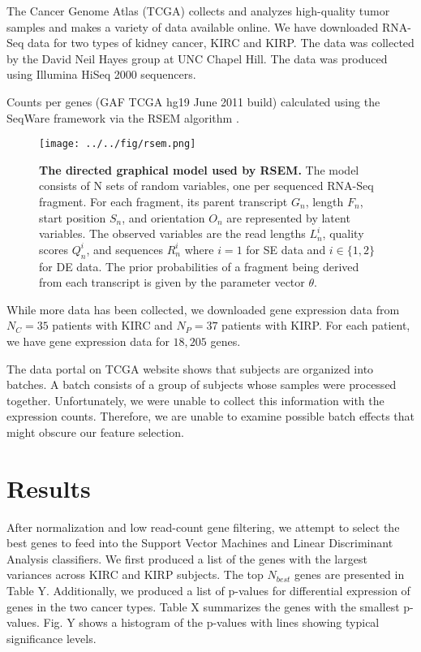 The Cancer Genome Atlas (TCGA) collects and analyzes high-quality tumor samples
and makes a variety of data available online. We have downloaded RNA-Seq data
for two types of kidney cancer, KIRC and KIRP. The data was collected by the
David Neil Hayes group at UNC Chapel Hill. The data was produced using Illumina
HiSeq 2000 sequencers. 

Counts per genes (GAF TCGA hg19 June 2011 build) calculated using the SeqWare
framework via the RSEM algorithm \cite{li2011rsem}.

\begin{figure}[H]
  \centering
    \texttt{[image: ../../fig/rsem.png]}
\caption{\textbf{The directed graphical model used by RSEM.} The model consists of N
sets of random variables, one per sequenced RNA-Seq fragment. For each fragment,
its parent transcript $G_n$, length $F_n$, start position  $S_n$, and orientation $O_n$
are represented by latent variables. The observed variables are the read lengths
$L_n^i$, quality scores $Q_n^i$, and sequences $R_n^i$ where $i = 1$ for SE data and
$i \in \{1,2\}$ for DE data. The prior probabilities of a
fragment being derived from each transcript is given by the parameter vector $\theta$.}
   \label{fig:rsem}
\end{figure}

While more data has been collected, we downloaded gene expression data from
$N_C =35$ patients with KIRC and $N_P = 37$ patients with KIRP.  For each
patient, we have gene expression data for $18,205$ genes. 

The data portal on TCGA website shows that subjects are organized into batches.
A batch consists of a group of subjects whose samples were processed together.
Unfortunately, we were unable to collect this information with the expression
counts. Therefore, we are unable to examine possible batch effects that might
obscure our feature selection. 

\section{Results}

After normalization and low read-count gene filtering, we attempt to select the
best genes to feed into the Support Vector Machines and Linear Discriminant
Analysis classifiers.  We first produced a list of the genes with the largest
variances across KIRC and KIRP subjects.  The top $N_{best}$ genes are
presented in Table Y. Additionally, we produced a list of p-values for
differential expression of genes in the two cancer types. Table X summarizes
the genes with the smallest p-values. Fig. Y shows a histogram of the p-values
with lines showing typical significance levels. 

